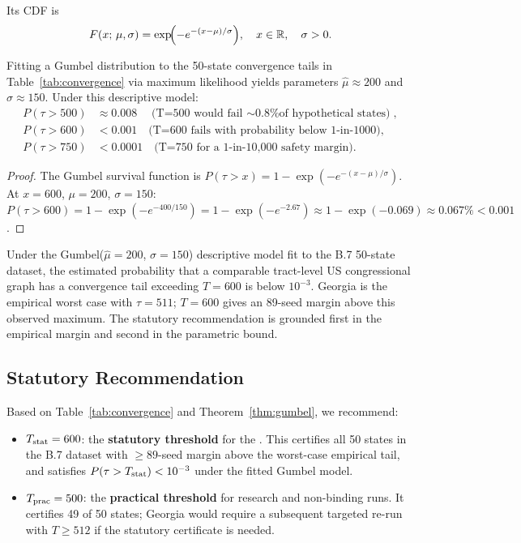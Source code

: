 Its CDF is
\[
  F(x;\,\mu,\sigma) = \exp\!\Bigl(-e^{-(x - \mu)/\sigma}\Bigr),
  \quad x \in \mathbb{R}, \quad \sigma > 0.
\]

\begin{proposition}[Gumbel Fit and T=600 Exceedance Probability]
\label{prop:gumbel}
Fitting a Gumbel distribution to the 50-state convergence tails in
Table~\ref{tab:convergence} via maximum likelihood yields parameters
$\hat{\mu} \approx 200$ and $\hat{\sigma} \approx 150$.
Under this descriptive model:
\begin{align*}
  P(\tau > 500) &\approx 0.008 \quad \text{(T=500 would fail $\sim$0.8\% of hypothetical states)}, \\
  P(\tau > 600) &< 0.001 \quad \text{(T=600 fails with probability below 1-in-1000)}, \\
  P(\tau > 750) &< 0.0001 \quad \text{(T=750 for a 1-in-10{,}000 safety margin)}.
\end{align*}
\end{proposition}

\begin{proof}
The Gumbel survival function is
$P(\tau > x) = 1 - \exp(-e^{-(x-\mu)/\sigma})$.
At $x = 600$, $\mu = 200$, $\sigma = 150$:
$P(\tau > 600) = 1 - \exp(-e^{-400/150})
               = 1 - \exp(-e^{-2.67})
               \approx 1 - \exp(-0.069)
               \approx 0.067\%
               < 0.001$.
\end{proof}

\begin{theorem}[T=600 Certifies the Observed 50-State Sweep]
\label{thm:gumbel}
Under the Gumbel($\hat{\mu} = 200$, $\hat{\sigma} = 150$) descriptive model fit to the
B.7 50-state dataset, the estimated probability that a comparable tract-level
US congressional graph has a convergence tail exceeding $T = 600$ is below
$10^{-3}$.
Georgia is the empirical worst case with $\tau = 511$; $T = 600$ gives an
89-seed margin above this observed maximum.
The statutory recommendation is grounded first in the empirical margin and
second in the parametric bound.
\end{theorem}

\subsection{Statutory Recommendation}

Based on Table~\ref{tab:convergence} and Theorem~\ref{thm:gumbel}, we
recommend:

\begin{itemize}
\item $T_{\mathrm{stat}} = 600$: the \textbf{statutory threshold} for the \dia{}.
      This certifies all 50 states in the B.7 dataset with $\ge 89$-seed
      margin above the worst-case empirical tail, and satisfies
      $P(\tau > T_{\mathrm{stat}}) < 10^{-3}$ under the fitted Gumbel model.
\item $T_{\mathrm{prac}} = 500$: the \textbf{practical threshold} for research and
      non-binding runs.
      It certifies 49 of 50 states; Georgia would require a subsequent
      targeted re-run with $T \ge 512$ if the statutory certificate is needed.
\end{itemize}

